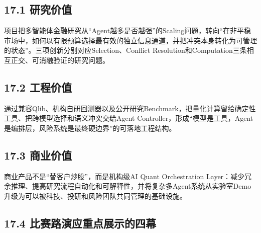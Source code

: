 \documentclass[12pt,a4paper]{ctexart}
\begin{document}
\subsection{\texorpdfstring{\textbf{17.1
研究价值}}{17.1 研究价值}}\label{ux7814ux7a76ux4ef7ux503c}

项目把多智能体金融研究从``Agent越多是否越强''的Scaling问题，转向``在非平稳市场中，如何以有限预算选择最有效的独立信息通道，并把冲突本身转化为可管理的状态''。三项创新分别对应Selection、Conflict
Resolution和Computation三条相互正交、可消融验证的研究问题。

\subsection{\texorpdfstring{\textbf{17.2
工程价值}}{17.2 工程价值}}\label{ux5de5ux7a0bux4ef7ux503c}

通过兼容Qlib、机构自研回测器以及公开研究Benchmark，把量化计算留给确定性工具、把跨模型选择和语义冲突交给Agent
Controller，形成``模型是工具，Agent是编排层，风险系统是最终硬边界''的可落地工程结构。

\subsection{\texorpdfstring{\textbf{17.3
商业价值}}{17.3 商业价值}}\label{ux5546ux4e1aux4ef7ux503c}

商业产品不是``替客户炒股''，而是机构级AI Quant Orchestration
Layer：减少冗余推理、提高研究流程自动化和可解释性，并将复杂多Agent系统从实验室Demo升级为可以被科技、投研和风险团队共同管理的基础设施。

\subsection{\texorpdfstring{\textbf{17.4
比赛路演应重点展示的四幕}}{17.4 比赛路演应重点展示的四幕}}\label{ux6bd4ux8d5bux8defux6f14ux5e94ux91cdux70b9ux5c55ux793aux7684ux56dbux5e55}
\end{document}
